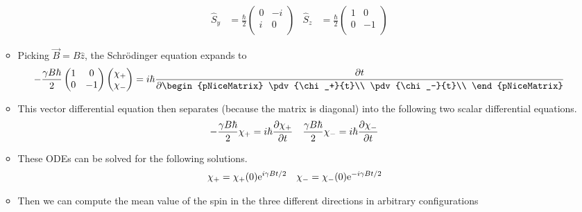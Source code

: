 \documentclass[../notes.tex]{subfiles}
\begin{document}
\begin{itemize}
\begin{itemize}
\begin{align*}
            \hat{S}_y &= \frac{\hbar}{2}
            \begin{pmatrix}
                0 & -i\\
                i & 0\\
            \end{pmatrix}&
            \hat{S}_z &= \frac{\hbar}{2}
            \begin{pmatrix}
                1 & 0\\
                0 & -1\\
            \end{pmatrix}
        \end{align*}
        \item Picking $\vec{B}=B\hat{z}$, the Schr\"{o}dinger equation expands to
        \begin{equation*}
            -\frac{\gamma B\hbar}{2}
            \begin{pmatrix}
                1 & 0\\
                0 & -1\\
            \end{pmatrix}
            \begin{pmatrix}
                \chi_+\\
                \chi_-\\
            \end{pmatrix}
            = i\hbar\pdv{t}
            \begin{pNiceMatrix}
                \pdv{\chi_+}{t}\\
                \pdv{\chi_-}{t}\\
            \end{pNiceMatrix}
        \end{equation*}
        \item This vector differential equation then separates (because the matrix is diagonal) into the following two scalar differential equations.
        \begin{align*}
            -\frac{\gamma B\hbar}{2}\chi_+ &= i\hbar\pdv{\chi_+}{t}&
            \frac{\gamma B\hbar}{2}\chi_- &= i\hbar\pdv{\chi_-}{t}
        \end{align*}
        \item These ODEs can be solved for the following solutions.
        \begin{align*}
            \chi_+ &= \chi_+(0)\e[i\gamma Bt/2]&
            \chi_- &= \chi_-(0)\e[-i\gamma Bt/2]
        \end{align*}
        \item Then we can compute the mean value of the spin in the three different directions in arbitrary configurations

\end{itemize}
\end{itemize}
\end{document}
